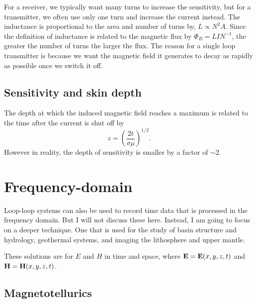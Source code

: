 For a receiver, we typically want many turns to increase the sensitivity, but
for a transmitter, we often use only one turn and increase the current instead.
The inductance is proportional to the area and number of turns by, $L
\propto N^{2} A$.  Since the definition of inductance is related to the
magnetic flux by $\Phi_{B} = L I N^{-1}$, the greater the number of turns
the larger the flux.  The reason for a single loop transmitter is because we
want the magnetic field it generates to decay as rapidly as possible once
we switch it off.

\subsection{Sensitivity and skin depth}

The depth at which the induced magnetic field reaches a maximum is related to
the time after the current is shut off by
\begin{equation*}
    z = \left( \frac{2 t}{\sigma \mu} \right)^{1/2}.
\end{equation*}
However in reality, the depth of sensitivity is smaller by a factor of $\sim$2.

\section{Frequency-domain}
Loop-loop systems can also be used to record time data that is processed in the
frequency domain.  But I will not discuss these here.  Instead, I am going to
focus on a deeper technique.  One that is used for the study of basin structure
and hydrology, geothermal systems, and imaging the lithosphere and upper mantle. 

These solutions are for $E$ and $H$ in time and space, where $\vb{E} =
\vb{E}(x,y,z,t)$ and $\vb{H} = \vb{H}(x,y,z,t)$.

\subsection{Magnetotellurics}

